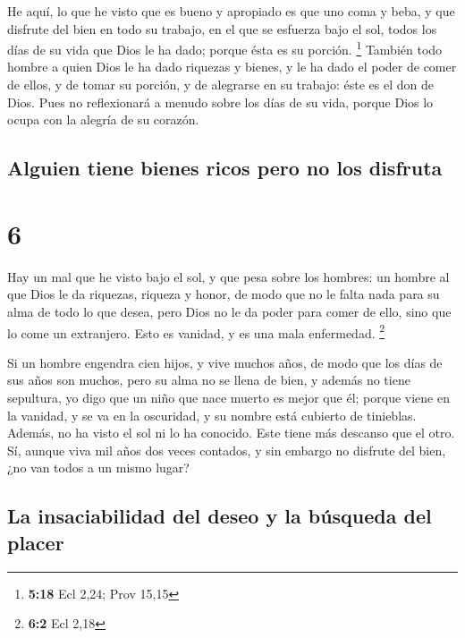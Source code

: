  He aquí, lo que he visto que es bueno y apropiado es que
uno coma y beba, y que disfrute del bien en todo su trabajo, en el que
se esfuerza bajo el sol, todos los días de su vida que Dios le ha dado;
porque ésta es su porción. \footnote{\textbf{5:18} Ecl 2,24; Prov 15,15}
 También todo hombre a quien Dios le ha dado riquezas y
bienes, y le ha dado el poder de comer de ellos, y de tomar su porción,
y de alegrarse en su trabajo: éste es el don de Dios. 
Pues no reflexionará a menudo sobre los días de su vida, porque Dios lo
ocupa con la alegría de su corazón.

\hypertarget{alguien-tiene-bienes-ricos-pero-no-los-disfruta}{%
\subsection{Alguien tiene bienes ricos pero no los
disfruta}\label{alguien-tiene-bienes-ricos-pero-no-los-disfruta}}

\hypertarget{section-5}{%
\section{6}\label{section-5}}

 Hay un mal que he visto bajo el sol, y que pesa sobre los
hombres:  un hombre al que Dios le da riquezas, riqueza y
honor, de modo que no le falta nada para su alma de todo lo que desea,
pero Dios no le da poder para comer de ello, sino que lo come un
extranjero. Esto es vanidad, y es una mala enfermedad. \footnote{\textbf{6:2}
  Ecl 2,18}

 Si un hombre engendra cien hijos, y vive muchos años, de
modo que los días de sus años son muchos, pero su alma no se llena de
bien, y además no tiene sepultura, yo digo que un niño que nace muerto
es mejor que él;  porque viene en la vanidad, y se va en
la oscuridad, y su nombre está cubierto de tinieblas. 
Además, no ha visto el sol ni lo ha conocido. Este tiene más descanso
que el otro.  Sí, aunque viva mil años dos veces contados,
y sin embargo no disfrute del bien, ¿no van todos a un mismo lugar?

\hypertarget{la-insaciabilidad-del-deseo-y-la-buxfasqueda-del-placer}{%
\subsection{La insaciabilidad del deseo y la búsqueda del
placer}\label{la-insaciabilidad-del-deseo-y-la-buxfasqueda-del-placer}}

